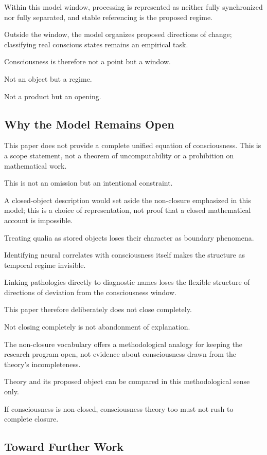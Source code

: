 Within this model window, processing is represented as neither fully synchronized nor fully separated, and stable referencing is the proposed regime.

Outside the window, the model organizes proposed directions of change; classifying real conscious states remains an empirical task.

Consciousness is therefore not a point but a window.

Not an object but a regime.

Not a product but an opening.

\subsection{Why the Model Remains Open}


This paper does not provide a complete unified equation of consciousness. This is a scope statement, not a theorem of uncomputability or a prohibition on mathematical work.

This is not an omission but an intentional constraint.

A closed-object description would set aside the non-closure emphasized in this model; this is a choice of representation, not proof that a closed mathematical account is impossible.

Treating qualia as stored objects loses their character as boundary phenomena.

Identifying neural correlates with consciousness itself makes the structure as temporal regime invisible.

Linking pathologies directly to diagnostic names loses the flexible structure of directions of deviation from the consciousness window.

This paper therefore deliberately does not close completely.

Not closing completely is not abandonment of explanation.

The non-closure vocabulary offers a methodological analogy for keeping the research program open, not evidence about consciousness drawn from the theory's incompleteness.

Theory and its proposed object can be compared in this methodological sense only.

If consciousness is non-closed, consciousness theory too must not rush to complete closure.

\subsection{Toward Further Work}


